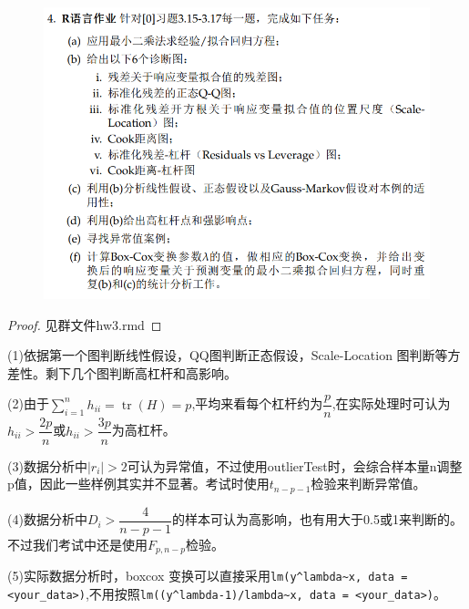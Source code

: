 \documentclass[cn,hazy,green,12pt,normal]{elegantnote}
\DeclareMathOperator{\tr}{tr}
\numberwithin{equation}{section}
\numberwithin{subsection}{section}
\begin{document}
\begin{homework}
\end{homework}
    \begin{figure}[!htbp]
        \centering
        \includegraphics[width=40em]{image/hw3_plt4.png}
    \end{figure}

\begin{proof}
    见群文件hw3.rmd
\end{proof}
\begin{note}
    (1)依据第一个图判断线性假设，QQ图判断正态假设，Scale-Location 图判断等方差性。剩下几个图判断高杠杆和高影响。
    
    (2)由于$\sum_{i=1}^n h_{ii}=\tr(H)=p$,平均来看每个杠杆约为$\dfrac{p}{n}$,在实际处理时可认为$h_{ii}>\dfrac{2p}{n}$或$h_{ii}> \dfrac{3p}{n}$为高杠杆。

    (3)数据分析中$|r_i|>2$可认为异常值，不过使用outlierTest时，会综合样本量n调整p值，因此一些样例其实并不显著。考试时使用$t_{n-p-1}$检验来判断异常值。
    
    (4)数据分析中$D_i>\dfrac{4}{n-p-1}$的样本可认为高影响，也有用大于0.5或1来判断的。不过我们考试中还是使用$F_{p,n-p}$检验。

    (5)实际数据分析时，boxcox 变换可以直接采用\lstinline{lm(y^lambda~x, data = <your_data>)},不用按照\lstinline{lm((y^lambda-1)/lambda~x, data = <your_data>)}。
\end{note}

\newpage
\end{document}

